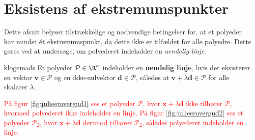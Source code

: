 \section{Eksistens af ekstremumspunkter}
%
Dette afsnit belyser tilstrækkelige og nødvendige betingelser for, at et polyeder har mindst ét ekstremumspunkt, da dette ikke er tilfældet for alle polyedre. 
Dette gøres ved at undersøge, om polyederet indeholder en \textit{uendelig linje}.
%
\begin{defn}{}{klogemads}
Et polyeder $\mathcal{P} \in \R^n$ indeholder en \textbf{uendelig linje}, hvis der eksisterer en vektor $\textbf{v} \in \mathcal{P}$ og en ikke-nulvektor $\textbf{d} \in \mathcal{P}$, således at $\textbf{v} + \lambda \textbf{d} \in \mathcal{P}$ for alle skalarer $\lambda$.
\end{defn}
\noindent
%
\textcolor{red}{
På figur \ref{fig:julieerovergud1} ses et polyeder $\mathcal{P}$, hvor $\mathbf{x} + \lambda \mathbf{d}$ ikke tilhører $\mathcal{P}$, hvormed polyederet ikke indeholder en linje. 
På figur \ref{fig:julieerovergud2} ses et polyeder $\mathcal{P}_2$, hvor $\mathbf{x} + \lambda \mathbf{d}$ derimod tilhører $\mathcal{P}_2$, således polyederet indeholder en linje.
}
\\\\
